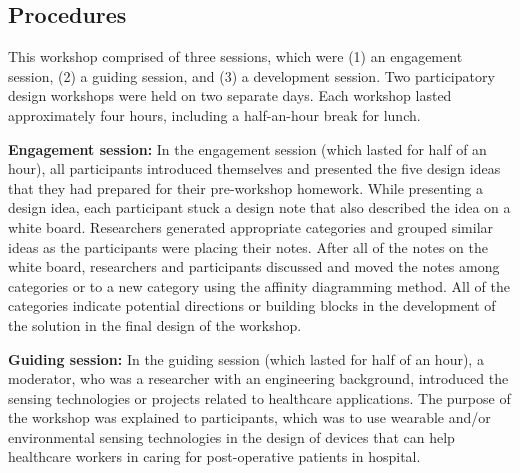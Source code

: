 \subsection{Procedures}
This workshop comprised of three sessions, which were (1) an engagement session, (2) a guiding session, and (3) a development session. Two participatory design workshops were held on two separate days. Each workshop lasted approximately four hours, including a half-an-hour break for lunch.

\textbf{Engagement session:} 
\newline
In the engagement session (which lasted for half of an hour), all participants introduced themselves and presented the five design ideas that they had prepared for their pre-workshop homework. While presenting a design idea, each participant stuck a design note that also described the idea on a white board. Researchers generated appropriate categories and grouped similar ideas as the participants were placing their notes. After all of the notes on the white board, researchers and participants discussed and moved the notes among categories or to a new category using the affinity diagramming method. All of the categories indicate potential directions or building blocks in the development of the solution in the final design of the workshop. 

\textbf{Guiding session:} 
\newline
In the guiding session (which lasted for half of an hour), a moderator, who was a researcher with an engineering background, introduced the sensing technologies or projects related to healthcare applications. The purpose of the workshop was explained to participants, which was to use wearable and/or environmental sensing technologies in the design of devices that can help healthcare workers in caring for post-operative patients in hospital. 

